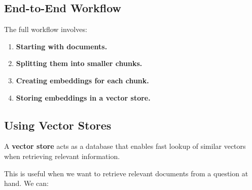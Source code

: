 \documentclass{article}
\begin{document}
\subsection{End-to-End Workflow}

The full workflow involves:

\begin{enumerate}
    \item \textbf{Starting with documents.}
    \item \textbf{Splitting them into smaller chunks.}
    \item \textbf{Creating embeddings for each chunk.}
    \item \textbf{Storing embeddings in a vector store.}
\end{enumerate}

\subsection{Using Vector Stores}

A \textbf{vector store} acts as a database that enables fast lookup of similar vectors when retrieving relevant information.

This is useful when we want to retrieve relevant documents from a question at hand. We can:
\end{document}

